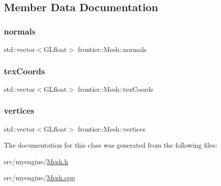 \subsection{Member Data Documentation}
\mbox{\label{classfrontier_1_1_mesh_a4edd8881188aec021d81b60e7b240fe8}} 
\subsubsection{\texorpdfstring{normals}{normals}}
{\footnotesize\ttfamily std\+::vector$<$G\+Lfloat$>$ frontier\+::\+Mesh\+::normals}

\mbox{\label{classfrontier_1_1_mesh_a67d643f39d706e80ae2d91d2eefea047}} 
\subsubsection{\texorpdfstring{tex\+Coords}{texCoords}}
{\footnotesize\ttfamily std\+::vector$<$G\+Lfloat$>$ frontier\+::\+Mesh\+::tex\+Coords}

\mbox{\label{classfrontier_1_1_mesh_adb7547dcfcfeac9f058c54d278f8046a}} 
\subsubsection{\texorpdfstring{vertices}{vertices}}
{\footnotesize\ttfamily std\+::vector$<$G\+Lfloat$>$ frontier\+::\+Mesh\+::vertices}



The documentation for this class was generated from the following files\+:\begin{DoxyCompactItemize}
\item 
src/myengine/\hyperlink{_mesh_8h}{Mesh.\+h}\item 
src/myengine/\hyperlink{_mesh_8cpp}{Mesh.\+cpp}\end{DoxyCompactItemize}
